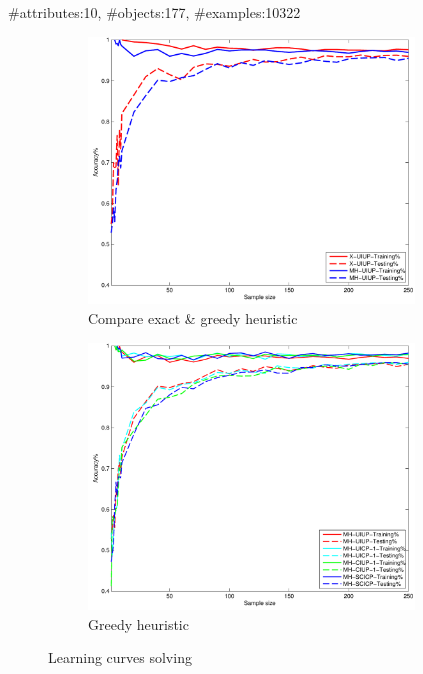 {
	\begin{center}
		\#attributes:10, \#objects:177, \#examples:10322
	\end{center}

  \begin{figure}
    \centering
    \begin{subfigure}[b]{0.48\textwidth}
      \centering
      \includegraphics[width=0.95\textwidth]{figs/PrefLearnResults/MatLabOutput/Wine_Trees_X_MH.pdf}
      \caption{Compare exact \& greedy heuristic}
    \end{subfigure}
    \begin{subfigure}[b]{0.48\textwidth}
      \centering
      \includegraphics[width=0.95\textwidth]{figs/PrefLearnResults/MatLabOutput/Wine_Trees_MH.pdf}
      \caption{Greedy heuristic}
    \end{subfigure}

    \caption{Learning curves solving }
  \end{figure}
}

